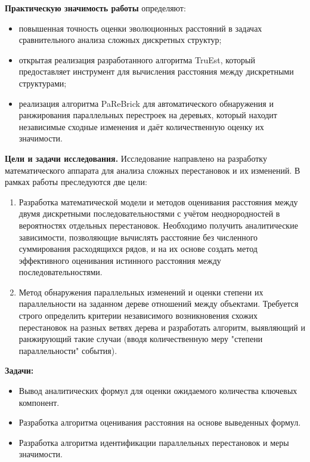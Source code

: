\textbf{Практическую значимость работы} определяют:
\begin{itemize}
    \item повышенная точность оценки эволюционных расстояний в задачах сравнительного анализа сложных дискретных структур;
    \item открытая реализация разработанного алгоритма TruEst, который предоставляет инструмент для вычисления расстояния между дискретными структурами;
    \item реализация алгоритма PaReBrick для автоматического обнаружения и ранжирования параллельных перестроек на деревьях, который находит независимые сходные изменения и даёт количественную оценку их значимости.
\end{itemize}

\textbf{Цели и задачи исследования.}
Исследование направлено на разработку математического аппарата для анализа сложных перестановок и их изменений. В рамках работы преследуются две цели:
\begin{enumerate}
    \item Разработка математической модели и методов оценивания расстояния между двумя дискретными последовательностями с учётом неоднородностей в вероятностях отдельных перестановок. Необходимо получить аналитические зависимости, позволяющие вычислять расстояние без численного суммирования расходящихся рядов, и на их основе создать метод эффективного оценивания истинного расстояния между последовательностями.
    \item Метод обнаружения параллельных изменений и оценки степени их параллельности на заданном дереве отношений между объектами. Требуется строго определить критерии независимого возникновения схожих перестановок на разных ветвях дерева и разработать алгоритм, выявляющий и ранжирующий такие случаи (вводя количественную меру "степени параллельности" события).
\end{enumerate}

\textbf{Задачи:}
\begin{itemize}
    \item Вывод аналитических формул для оценки ожидаемого количества ключевых компонент.
    \item Разработка алгоритма оценивания расстояния на основе выведенных формул.
    \item Разработка алгоритма идентификации параллельных перестановок и меры значимости.
\end{itemize}

